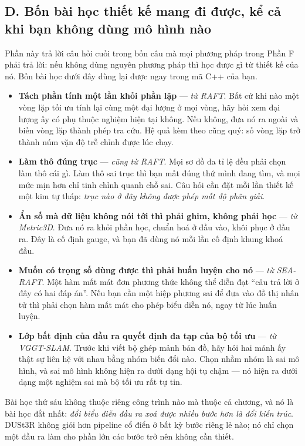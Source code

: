 \documentclass[../../deep_learning.tex]{subfiles}
\begin{document}
\subsection{D. Bốn bài học thiết kế mang đi được, kể cả khi bạn không dùng mô hình nào}
Phần này trả lời câu hỏi cuối trong bốn câu mà mọi phương pháp trong Phần F phải trả lời: nếu không dùng nguyên phương pháp thì học được gì từ thiết kế của nó. Bốn bài học dưới đây dùng lại được ngay trong mã C++ của bạn.

\begin{itemize}
\item \textbf{Tách phần tính một lần khỏi phần lặp} --- \emph{từ RAFT}. Bất cứ khi nào một vòng lặp tối ưu tính lại cùng một đại lượng ở mọi vòng, hãy hỏi xem đại lượng ấy có phụ thuộc nghiệm hiện tại không. Nếu không, đưa nó ra ngoài và biến vòng lặp thành phép tra cứu. Hệ quả kèm theo cũng quý: số vòng lặp trở thành núm vặn độ trễ chỉnh được lúc chạy.
\item \textbf{Làm thô đúng trục} --- \emph{cũng từ RAFT}. Mọi sơ đồ đa tỉ lệ đều phải chọn làm thô cái gì. Làm thô sai trục thì bạn mất đúng thứ mình đang tìm, và mọi mức mịn hơn chỉ tinh chỉnh quanh chỗ sai. Câu hỏi cần đặt mỗi lần thiết kế một kim tự tháp: \emph{trục nào ở đây không được phép mất độ phân giải}.
\item \textbf{Ẩn số mà dữ liệu không nói tới thì phải ghim, không phải học} --- \emph{từ Metric3D}. Đưa nó ra khỏi phần học, chuẩn hoá ở đầu vào, khôi phục ở đầu ra. Đây là cố định gauge, và bạn đã dùng nó mỗi lần cố định khung khoá đầu.
\item \textbf{Muốn có trọng số dùng được thì phải huấn luyện cho nó} --- \emph{từ SEA-RAFT}. Một hàm mất mát đơn phương thức không thể diễn đạt ``câu trả lời ở đây có hai đáp án''. Nếu bạn cần một hiệp phương sai để đưa vào đồ thị nhân tử thì phải chọn hàm mất mát cho phép biểu diễn nó, ngay từ lúc huấn luyện.
\item \textbf{Lớp bất định của đầu ra quyết định đa tạp của bộ tối ưu} --- \emph{từ VGGT-SLAM}. Trước khi viết bộ ghép mảnh bản đồ, hãy hỏi hai mảnh ấy thật sự liên hệ với nhau bằng nhóm biến đổi nào. Chọn nhầm nhóm là sai mô hình, và sai mô hình không hiện ra dưới dạng hội tụ chậm --- nó hiện ra dưới dạng một nghiệm sai mà bộ tối ưu rất tự tin.
\end{itemize}

Bài học thứ sáu không thuộc riêng công trình nào mà thuộc cả chương, và nó là bài học đắt nhất: \emph{đổi biểu diễn đầu ra xoá được nhiều bước hơn là đổi kiến trúc}. DUSt3R không giỏi hơn pipeline cổ điển ở bất kỳ bước riêng lẻ nào; nó chỉ chọn một đầu ra làm cho phần lớn các bước trở nên không cần thiết.
\end{document}
